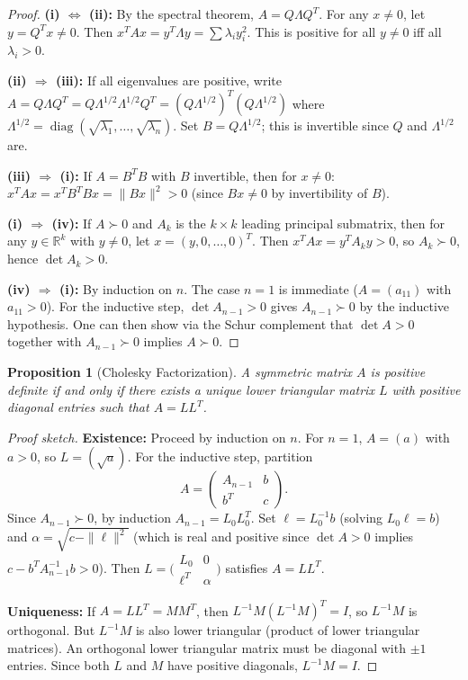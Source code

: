 \documentclass[11pt,a4paper]{article}
\theoremstyle{definition}
\theoremstyle{plain}
\newtheorem{proposition}[theorem]{Proposition}
\theoremstyle{remark}
\newcommand{\R}{\mathbb{R}}
\DeclareMathOperator{\diag}{diag}
\begin{document}
\begin{proof}
\textbf{(i) $\Leftrightarrow$ (ii):} By the spectral theorem, $A = Q\Lambda Q^T$. For any
$x \neq 0$, let $y = Q^T x \neq 0$. Then $x^T A x = y^T \Lambda y = \sum \lambda_i y_i^2$.
This is positive for all $y \neq 0$ iff all $\lambda_i > 0$.

\textbf{(ii) $\Rightarrow$ (iii):} If all eigenvalues are positive, write
$A = Q \Lambda Q^T = Q \Lambda^{1/2} \Lambda^{1/2} Q^T = (Q\Lambda^{1/2})^T (Q\Lambda^{1/2})$
where $\Lambda^{1/2} = \diag(\sqrt{\lambda_1}, \ldots, \sqrt{\lambda_n})$. Set
$B = Q\Lambda^{1/2}$; this is invertible since $Q$ and $\Lambda^{1/2}$ are.

\textbf{(iii) $\Rightarrow$ (i):} If $A = B^TB$ with $B$ invertible, then for $x \neq 0$:
$x^TAx = x^TB^TBx = \|Bx\|^2 > 0$ (since $Bx \neq 0$ by invertibility of $B$).

\textbf{(i) $\Rightarrow$ (iv):} If $A \succ 0$ and $A_k$ is the $k \times k$ leading
principal submatrix, then for any $y \in \R^k$ with $y \neq 0$, let $x = (y, 0, \ldots, 0)^T$.
Then $x^TAx = y^T A_k y > 0$, so $A_k \succ 0$, hence $\det A_k > 0$.

\textbf{(iv) $\Rightarrow$ (i):} By induction on $n$. The case $n = 1$ is immediate
($A = (a_{11})$ with $a_{11} > 0$). For the inductive step, $\det A_{n-1} > 0$ gives
$A_{n-1} \succ 0$ by the inductive hypothesis. One can then show via the Schur complement
that $\det A > 0$ together with $A_{n-1} \succ 0$ implies $A \succ 0$.
\end{proof}

\begin{proposition}[Cholesky Factorization]
\label{prop:cholesky}
A symmetric matrix $A$ is positive definite if and only if there exists a unique lower
triangular matrix $L$ with positive diagonal entries such that $A = LL^T$.
\end{proposition}

\begin{proof}[Proof sketch]
\textbf{Existence:} Proceed by induction on $n$. For $n = 1$, $A = (a)$ with $a > 0$, so
$L = (\sqrt{a})$. For the inductive step, partition
\[
    A = \begin{pmatrix} A_{n-1} & b \\ b^T & c \end{pmatrix}.
\]
Since $A_{n-1} \succ 0$, by induction $A_{n-1} = L_0 L_0^T$. Set $\ell = L_0^{-1} b$
(solving $L_0 \ell = b$) and $\alpha = \sqrt{c - \|\ell\|^2}$ (which is real and positive
since $\det A > 0$ implies $c - b^T A_{n-1}^{-1} b > 0$). Then
$L = \bigl(\begin{smallmatrix} L_0 & 0 \\ \ell^T & \alpha \end{smallmatrix}\bigr)$
satisfies $A = LL^T$.

\textbf{Uniqueness:} If $A = LL^T = MM^T$, then $L^{-1}M(L^{-1}M)^T = I$, so
$L^{-1}M$ is orthogonal. But $L^{-1}M$ is also lower triangular (product of lower
triangular matrices). An orthogonal lower triangular matrix must be diagonal with
$\pm 1$ entries. Since both $L$ and $M$ have positive diagonals, $L^{-1}M = I$.
\end{proof}
\end{document}
